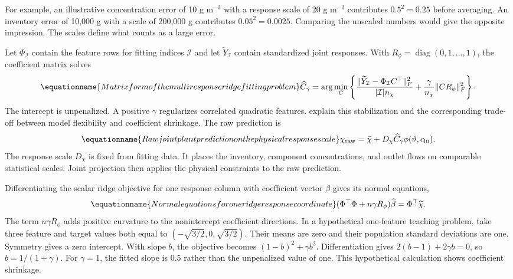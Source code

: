 For example, an illustrative concentration error of 10 g m$^{-3}$ with a response scale of 20 g m$^{-3}$ contributes $0.5^2=0.25$ before averaging. An inventory error of 10{,}000 g with a scale of 200{,}000 g contributes $0.05^2=0.0025$. Comparing the unscaled numbers would give the opposite impression. The scales define what counts as a large error.

Let $\Phi_{\mathcal I}$ contain the feature rows for fitting indices $\mathcal I$ and let $\widetilde Y_{\mathcal I}$ contain standardized joint responses. With $R_\phi=\operatorname{diag}(0,1,\ldots,1)$, the coefficient matrix solves
\begin{equation}
\equationname{Matrix form of the multiresponse ridge fitting problem}
\widehat C_\gamma=\arg\min_C
\left\{\frac{\|\widetilde Y_{\mathcal I}-\Phi_{\mathcal I}C^\top\|_F^2}
{|\mathcal I|n_\chi}+\frac{\gamma}{n_\chi}\|CR_\phi\|_F^2\right\}.
\label{eq:plant_ridge_fit}
\end{equation}
The intercept is unpenalized. A positive $\gamma$ regularizes correlated quadratic features. \citet{Hastie2009} explain this stabilization and the corresponding trade-off between model flexibility and coefficient shrinkage. The raw prediction is
\begin{equation}
\equationname{Raw joint plant prediction on the physical response scale}
\chi_{\rm raw}=\bar\chi+D_\chi\widehat C_\gamma\phi(\vartheta,c_{\rm in}).
\label{eq:plant_raw_prediction}
\end{equation}
The response scale $D_\chi$ is fixed from fitting data. It places the inventory, component concentrations, and outlet flows on comparable statistical scales. Joint projection then applies the physical constraints to the raw prediction.

Differentiating the scalar ridge objective for one response column with coefficient vector $\beta$ gives its normal equations,
\begin{equation}
\equationname{Normal equations for one ridge response coordinate}
(\Phi^\top\Phi+n\gamma R_\phi)\widehat\beta=\Phi^\top\widetilde\chi.
\end{equation}
The term $n\gamma R_\phi$ adds positive curvature to the nonintercept coefficient directions. In a hypothetical one-feature teaching problem, take three feature and target values both equal to $(-\sqrt{3/2},0,\sqrt{3/2})$. Their means are zero and their population standard deviations are one. Symmetry gives a zero intercept. With slope $b$, the objective becomes $(1-b)^2+\gamma b^2$. Differentiation gives $2(b-1)+2\gamma b=0$, so $\widehat b=1/(1+\gamma)$. For $\gamma=1$, the fitted slope is $0.5$ rather than the unpenalized value of one. This hypothetical calculation shows coefficient shrinkage.

